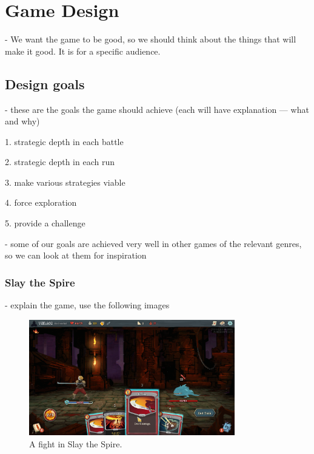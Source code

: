 \chapter{Game Design}

- We want the game to be good, so we should think about the things that will make it good. It is for a specific audience.

\section{Design goals}

- these are the goals the game should achieve (each will have explanation --- what and why)

1. strategic depth in each battle

2. strategic depth in each run

3. make various strategies viable

4. force exploration

5. provide a challenge

- some of our goals are achieved very well in other games of the relevant genres, so we can look at them for inspiration

\subsection{Slay the Spire}

- explain the game, use the following images

\begin{figure}[htb]
    \centering
    \includegraphics[width=0.8\textwidth]{img/Slay-the-Spire-Fight.png}
    \caption{A fight in Slay the Spire.}
    \label{fig:slay-the-spire-fight}
\end{figure}

